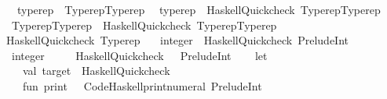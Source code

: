 \begin{isabellebody}
{\isacartoucheclose}\ \ \ typerep\ \ Typerep{\isachardot}{\kern0pt}Typerep\isanewline
{\isacharbar}{\kern0pt}\ \ typerep\ {\isasymrightharpoonup}\ {\isacharparenleft}{\kern0pt}Haskell{\isacharunderscore}{\kern0pt}Quickcheck{\isacharparenright}{\kern0pt}\ {\isachardoublequoteopen}Typerep{\isachardot}{\kern0pt}Typerep{\isachardoublequoteclose}\isanewline
{\isacharbar}{\kern0pt}\ \ Typerep{\isachardot}{\kern0pt}Typerep\ {\isasymrightharpoonup}\ {\isacharparenleft}{\kern0pt}Haskell{\isacharunderscore}{\kern0pt}Quickcheck{\isacharparenright}{\kern0pt}\ {\isachardoublequoteopen}Typerep{\isachardot}{\kern0pt}Typerep{\isachardoublequoteclose}\isanewline
\isanewline
{}\isamarkupfalse%
\ Haskell{\isacharunderscore}{\kern0pt}Quickcheck\ Typerep\isanewline
\isanewline
{}\isamarkupfalse%
\isanewline
\ \ \ integer\ {\isasymrightharpoonup}\ {\isacharparenleft}{\kern0pt}Haskell{\isacharunderscore}{\kern0pt}Quickcheck{\isacharparenright}{\kern0pt}\ {\isachardoublequoteopen}Prelude{\isachardot}{\kern0pt}Int{\isachardoublequoteclose}\isanewline
{\isacharbar}{\kern0pt}\ \ {\isachardoublequoteopen}{}{\isacharcolon}{\kern0pt}{\isacharcolon}{\kern0pt}integer{\isachardoublequoteclose}\ {\isasymrightharpoonup}\isanewline
\ \ \ \ {\isacharparenleft}{\kern0pt}Haskell{\isacharunderscore}{\kern0pt}Quickcheck{\isacharparenright}{\kern0pt}\ {\isachardoublequoteopen}{\isacharbang}{\kern0pt}{\isacharparenleft}{\kern0pt}{}{\isacharslash}{\kern0pt}\ {\isacharcolon}{\kern0pt}{\isacharcolon}{\kern0pt}{\isacharslash}{\kern0pt}\ Prelude{\isachardot}{\kern0pt}Int{\isacharparenright}{\kern0pt}{\isachardoublequoteclose}\isanewline
%
\isadelimML
\isanewline
%
\endisadelimML
%
\isatagML
{}\isamarkupfalse%
\ {\isacartoucheopen}\isanewline
\ \ let\isanewline
\ \ \ \ val\ target\ {\isacharequal}{\kern0pt}\ {\isachardoublequote}{\kern0pt}Haskell{\isacharunderscore}{\kern0pt}Quickcheck{\isachardoublequote}{\kern0pt}{\isacharsemicolon}{\kern0pt}\isanewline
\ \ \ \ fun\ print\ {\isacharunderscore}{\kern0pt}\ {\isacharequal}{\kern0pt}\ Code{\isacharunderscore}{\kern0pt}Haskell{\isachardot}{\kern0pt}print{\isacharunderscore}{\kern0pt}numeral\ {\isachardoublequote}{\kern0pt}Prelude{\isachardot}{\kern0pt}Int{\isachardoublequote}{\kern0pt}{\isacharsemicolon}{\kern0pt}\isanewline

\end{isabellebody}
